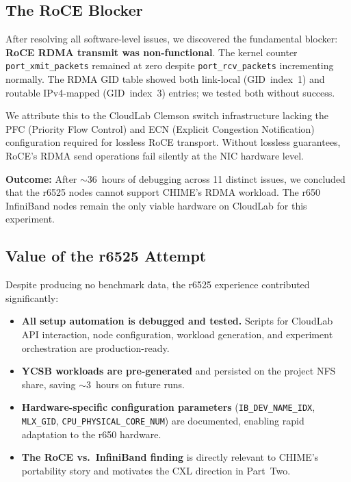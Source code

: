 \documentclass[11pt,a4paper]{article}
\begin{document}
\subsection{The RoCE Blocker}

After resolving all software-level issues, we discovered the fundamental blocker: \textbf{RoCE RDMA transmit was non-functional}. The kernel counter \texttt{port\_xmit\_packets} remained at zero despite \texttt{port\_rcv\_packets} incrementing normally. The RDMA GID table showed both link-local (GID~index~1) and routable IPv4-mapped (GID~index~3) entries; we tested both without success.

We attribute this to the CloudLab Clemson switch infrastructure lacking the PFC (Priority Flow Control) and ECN (Explicit Congestion Notification) configuration required for lossless RoCE transport. Without lossless guarantees, RoCE's RDMA send operations fail silently at the NIC hardware level.

\textbf{Outcome:} After $\sim$36~hours of debugging across 11 distinct issues, we concluded that the r6525 nodes cannot support CHIME's RDMA workload. The r650 InfiniBand nodes remain the only viable hardware on CloudLab for this experiment.

\subsection{Value of the r6525 Attempt}

Despite producing no benchmark data, the r6525 experience contributed significantly:
\begin{itemize}[nosep]
    \item \textbf{All setup automation is debugged and tested.} Scripts for CloudLab API interaction, node configuration, workload generation, and experiment orchestration are production-ready.
    \item \textbf{YCSB workloads are pre-generated} and persisted on the project NFS share, saving $\sim$3~hours on future runs.
    \item \textbf{Hardware-specific configuration parameters} (\texttt{IB\_DEV\_NAME\_IDX}, \texttt{MLX\_GID}, \texttt{CPU\_PHYSICAL\_CORE\_NUM}) are documented, enabling rapid adaptation to the r650 hardware.
    \item \textbf{The RoCE vs.\ InfiniBand finding} is directly relevant to CHIME's portability story and motivates the CXL direction in Part~Two.
\end{itemize}
\end{document}
